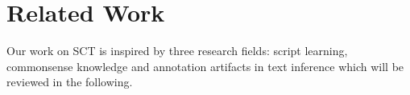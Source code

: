 \section{Related Work}
\label{sec:related}

Our work on SCT is inspired by three research fields: script learning, commonsense knowledge and annotation artifacts in text inference  which will be reviewed in the following.





